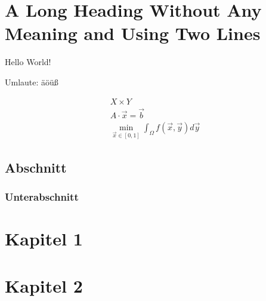 \documentclass[
  fontsize=12pt,
  DIV=calc,
  headings=normal,
]{scrbook}
\begin{document}
  
  
  \cleardoublepage
  
  
  \tableofcontents
  
  
  
  
  
  \chapter{A Long Heading Without Any Meaning and Using Two Lines}
  Hello World!
  
  Umlaute: äöüß
    
  \begin{gather}
    X \times Y\\
    A \cdot \vec{x} = \vec{b}\\
    \min_{\vec{x} \in [0, 1]} \int_\Omega f(\vec{x}, \vec{y}) d\vec{y}
  \end{gather}
  
  \section{Abschnitt}
  
  \blindtext
  
  \subsection{Unterabschnitt}
  
  \blindtext
  
  \chapter{Kapitel 1}
  \blindmathpaper
  
  \chapter{Kapitel 2}
  \blindmathpaper
  
  \appendix
  
  \nocite{*}
  \printbibliography[heading=bibintoc]
\end{document}
